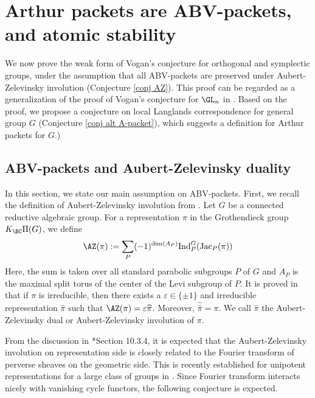 \documentclass[11pt,letterpaper]{amsart}
\numberwithin{equation}{section}
\begin{document}
\section{Arthur packets are ABV-packets, and atomic stability}\label{subsection: Arthur packets revisited, 2}

We now prove the weak form of Vogan's conjecture for orthogonal and symplectic groups, under the assumption that all ABV-packets are preserved under Aubert-Zelevinsky involution (Conjecture \ref{conj AZ}). 
This proof can be regarded as a generalization of the proof of Vogan's conjecture for $\GL_n$ in \cite{Lo24}. Based on the proof, we propose a conjecture on local Langlands correspondence for general group $G$ (Conjecture \ref{conj alt A-packet}), which suggests a definition for Arthur packets for $G$.)

\subsection{ABV-packets and Aubert-Zelevinsky duality}\label{sec AZ}

In this section, we state our main assumption on ABV-packets. First, we recall the definition of Aubert-Zelevinsky involution from \cite{Aub95}. 
Let $G$ be a connected reductive algebraic group. For a representation  $\pi$ in the Grothendieck group $K_{\BC}\Pi(G)$, we define
\begin{align}\label{eq def AZ}
    \AZ(\pi):=\sum_P (-1)^{\mathrm{dim}(A_P)}\mathrm{Ind}_{P}^{G}(\textrm{Jac}_P(\pi))
\end{align}
Here, the sum is taken over all standard parabolic subgroups $P$ of $G$ and $A_P$ is the maximal split torus of the center of the Levi subgroup of $P$.
It is proved in \cite{Aub95} that if $\pi$ is irreducible, then there exists a $\varepsilon\in\{\pm 1\}$ and irreducible representation $\widehat{\pi}$ 
such that $\AZ(\pi)=\varepsilon \widehat{\pi}$.
Moreover, $\widehat{\widehat{\pi}}=\pi$.
We call $\widehat{\pi}$ the Aubert-Zelevinsky dual or Aubert-Zelevinsky involution of $\pi$. 


From the discussion in \cite{CFMMX22}*{Section 10.3.4}, it is expected that the Aubert-Zelevinsky involution on representation side is closely related to the Fourier transform of perverse sheaves on the geometric side. This is recently established for unipotent representations for a large class of groups in \cite{AO26}. Since Fourier transform interacts nicely with vanishing cycle functors, the following conjecture is expected. 
\end{document}
